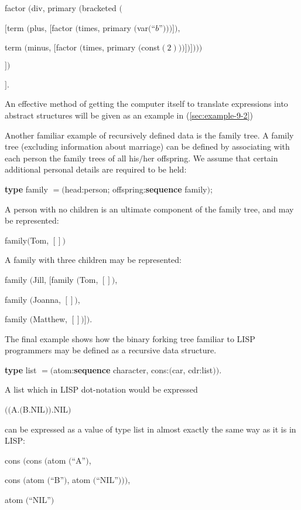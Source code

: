 \quad \quad factor $($div, primary $($bracketed $($

\quad \quad \quad $[$term $($plus, $[$factor $($times, primary $($var$($``$b$''$)))]),$

\quad \quad \quad\hspace{.1em} term $($minus, $[$factor $($times, primary $($const$(2)))])])))$

\quad \quad $])$

\quad $]$.

\noindent
An effective method of getting the computer itself to translate expressions into abstract structures will be given as an example in (\ref{sec:example-9-2})

Another familiar example of recursively defined data is the family tree. A family tree (excluding information about marriage) can be defined by associating with each person the family trees of all his$/$her offspring. We assume that certain additional personal details are required to be held: 

\quad \textbf{type} family $= ($head:person; offspring:\textbf{sequence} family$)$;

A person with no children is an ultimate component of the family tree, and may be represented:

\quad family$($Tom, $[])$

\noindent
A family with three children may be represented:

\noindent
family $($Jill, $[$family $($Tom, $[])$,

\tabto{3.2em} family $($Joanna, $[])$,

\tabto{3.2em} family $($Matthew, $[])])$.

The final example shows how the binary forking tree familiar to LISP programmers may be defined as a recursive data structure.

\quad \textbf{type} list $= ($atom:\textbf{sequence} character, cons:$($car, cdr:list$))$.

\noindent
A list which in LISP dot-notation would be expressed

\quad $(($A.$($B.NIL$))$.NIL$)$

\noindent
can be expressed as a value of type list in almost exactly the same way as it is in LISP:

\quad cons $($cons $($atom $($``A''$)$,

\tabto{5em} cons $($atom $($``B''$)$, atom $($``NIL''$)))$,

\tabto{5em} atom $($``NIL''$)$

